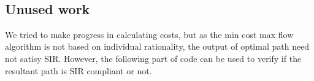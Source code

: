 \documentclass[11pt]{article}
\begin{document}
    \begin{center}
    \end{center}
    { \hspace*{\fill} \\}
    
    \subsection{Unused work}\label{unused-work}

We tried to make progress in calculating costs, but as the min cost max
flow algorithm is not based on individual rationality, the output of
optimal path need not satisy SIR. However, the following part of code
can be used to verify if the resultant path is SIR compliant or not.
\end{document}

